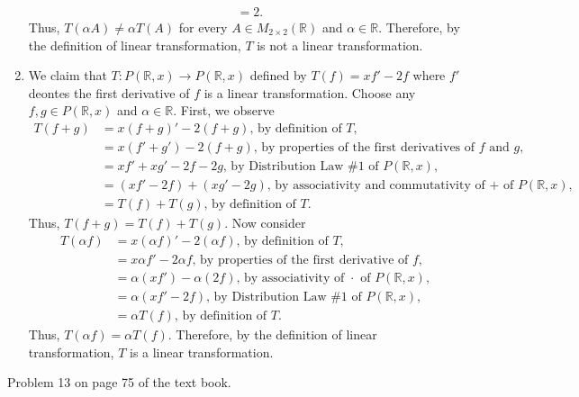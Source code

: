 \documentclass[12pt,answers]{exam}
\newcommand{\R}{\mathbb{R}}
\newenvironment{problem}[2][Problem]{\begin{trivlist}
\item[\hskip \labelsep {\bfseries #1}\hskip \labelsep {\bfseries #2.}]}{\end{trivlist}}
\begin{document}
\begin{solution}
\begin{enumerate}[label=\roman*)]
\begin{align*}
	&=2.
\end{align*} Thus, $T(\alpha A)\neq \alpha T(A)$ for every $A\in M_{2\times 2}(\R)$ and $\alpha\in\R$. Therefore, by the definition of linear transformation, $T$ is not a linear transformation.
\item We claim that $T:P(\R,x)\rightarrow P(\R,x)$ defined by $T(f)=xf'-2f$ where $f'$ deontes the first derivative of $f$ is a linear transformation. Choose any $f,g\in P(\R,x)$ and $\alpha\in \R$.  
First, we observe
\begin{align*}
	T(f+g)&=x(f+g)'-2(f+g) \text{, by definition of $T$,} \\
	&=x(f'+g')-2(f+g) \text{, by properties of the first derivatives of $f$ and $g$,} \\
	&=xf'+xg'-2f-2g \text{, by Distribution Law \#1 of $P(\R,x)$,} \\
	&=(xf'-2f)+(xg'-2g) \text{, by associativity and commutativity of + of $P(\R,x)$,} \\
	&=T(f)+T(g) \text{, by definition of $T$.}
\end{align*} Thus, $T(f+g)=T(f)+T(g)$. Now consider
\begin{align*}
	T(\alpha f)&=x(\alpha f)'-2(\alpha f) \text{, by definition of $T$,} \\
	&=x\alpha f'-2\alpha f \text{, by properties of the first derivative of $f$,} \\
	&=\alpha(xf')-\alpha(2f) \text{, by associativity of $\cdot$ of $P(\R,x)$,} \\
	&=\alpha(xf'-2f) \text{, by Distribution Law \#1 of $P(\R,x)$,} \\
	&=\alpha T(f) \text{, by definition of $T$.}
\end{align*} Thus, $T(\alpha f)=\alpha T(f)$. Therefore, by the definition of linear transformation, $T$ is a linear transformation.
\end{enumerate}
\end{solution}

\begin{problem}{3}
Problem 13 on page 75 of the text book.
\end{problem}
\end{document}
